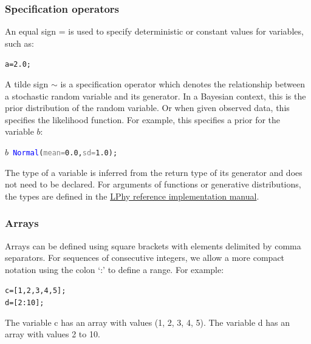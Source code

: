 \documentclass[10pt,letterpaper,table]{article}
\theoremstyle{definition}
\begin{document}
\subsubsection{Specification operators}
An equal sign = is used to specify deterministic or constant values for variables, such as: 
{
  \small
  \begin{listing}
    \begin{alltt}
    a = \textcolor{constant}{2.0};
    \end{alltt}
  \end{listing}
}
\noindent A tilde sign $\sim$ is a specification operator which denotes the relationship between a stochastic random variable and its generator. 
In a Bayesian context, this is the prior distribution of the random variable. 
Or when given observed data, this specifies the likelihood function. 
For example, this specifies a prior for the variable $b$:  
{
  \small
  \begin{listing}
    \begin{alltt}
    \textcolor{bluishgreen}{\(b\)} ~ \textcolor{blue}{Normal}(\textcolor{gray}{mean=}\textcolor{constant}{0.0}, \textcolor{gray}{sd=}\textcolor{constant}{1.0});
    \end{alltt}
  \end{listing}
}

The type of a variable is inferred from the return type of its generator and does not need to be declared. 
For arguments of functions or generative distributions, the types are defined in the  \href{https://github.com/LinguaPhylo/linguaPhylo/blob/master/lphy/doc/index.md}{LPhy reference implementation manual}. 

\subsubsection{Arrays}
Arrays can be defined using square brackets with elements delimited by comma separators. 
For sequences of consecutive integers, we allow a more compact notation using the colon `:' to define a range.
For example:  
{
  \small
  \begin{listing}
    \begin{alltt}
    c =[\textcolor{constant}{1}, \textcolor{constant}{2}, \textcolor{constant}{3}, \textcolor{constant}{4}, \textcolor{constant}{5}];
    d =[\textcolor{constant}{2}:\textcolor{constant}{10}];
    \end{alltt}
  \end{listing}
}
\noindent The variable c has an array with values (1, 2, 3, 4, 5). 
The variable d has an array with values 2 to 10.
\end{document}
